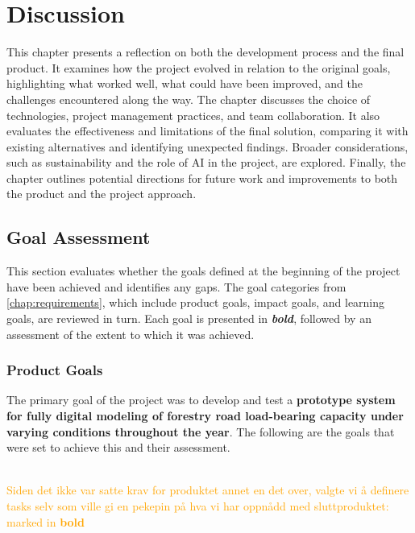 \chapter{Discussion}\label{chap:discussion}

This chapter presents a reflection on both the development process and the final product. It examines how the project evolved in relation to the original goals, highlighting what worked well, what could have been improved, and the challenges encountered along the way. The chapter discusses the choice of technologies, project management practices, and team collaboration. It also evaluates the effectiveness and limitations of the final solution, comparing it with existing alternatives and identifying unexpected findings. Broader considerations, such as sustainability and the role of AI in the project, are explored. Finally, the chapter outlines potential directions for future work and improvements to both the product and the project approach.

\section{Goal Assessment}

This section evaluates whether the goals defined at the beginning of the project have been achieved and identifies any gaps. The goal categories from \autoref{chap:requirements}, which include product goals, impact goals, and learning goals, are reviewed in turn. Each goal is presented in \textit{\textbf{bold}}, followed by an assessment of the extent to which it was achieved.

\subsection{Product Goals}

The primary goal of the project was to develop and test a \textbf{prototype system for fully digital modeling of forestry road load-bearing capacity under varying conditions throughout the year}. The following are the goals that were set to achieve this and their assessment.   

\\ \textcolor{orange}{Siden det ikke var satte krav for produktet annet en det over, valgte vi å definere tasks selv som ville gi en pekepin på hva vi har oppnådd med sluttproduktet: marked in \textbf{bold}}

